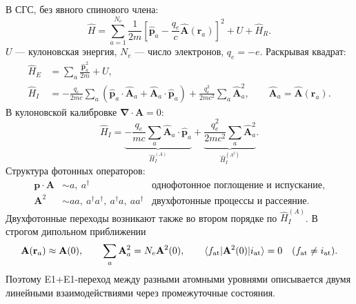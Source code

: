 \documentclass[../final.tex]{subfiles}
\begin{document}
В СГС, без явного спинового члена:
\begin{equation*}
    \hat H=\sum_{a=1}^{N_e}\frac1{2m}
      \left[\hat{\mathbf p}_a-\frac{q_e}{c}
      \hat{\mathbf A}(\mathbf r_a)\right]^2+U+\hat H_R.
\end{equation*}
\(U\) --- кулоновская энергия, \(N_e\) --- число электронов,
\(q_e=-e\). Раскрывая квадрат:
\begin{align*}
    \hat H_E&=\sum_a\frac{\hat{\mathbf p}_a^2}{2m}+U,\\
    \hat H_I&=-\frac{q_e}{2mc}\sum_a
      (\hat{\mathbf p}_a\cdot\hat{\mathbf A}_a+
       \hat{\mathbf A}_a\cdot\hat{\mathbf p}_a)
      +\frac{q_e^2}{2mc^2}\sum_a\hat{\mathbf A}_a^2,
      \qquad \hat{\mathbf A}_a=\hat{\mathbf A}(\mathbf r_a).
\end{align*}
В кулоновской калибровке \(\boldsymbol\nabla\cdot\mathbf A=0\):
\begin{equation*}
    \hat H_I=
      \underbrace{-\frac{q_e}{mc}\sum_a
        \hat{\mathbf A}_a\cdot\hat{\mathbf p}_a}_{\hat H_I^{(A)}}
      +\underbrace{\frac{q_e^2}{2mc^2}\sum_a
        \hat{\mathbf A}_a^2}_{\hat H_I^{(A^2)}}.
\end{equation*}
Структура фотонных операторов:
\begin{equation*}
    \begin{array}{ccl}
        \mathbf p\cdot\mathbf A&\sim a,\ a^\dagger&
            \text{однофотонное поглощение и испускание},\\
        \mathbf A^2&\sim aa,\ a^\dagger a^\dagger,\ a^\dagger a,\ aa^\dagger&
            \text{двухфотонные процессы и рассеяние}.
    \end{array}
\end{equation*}
Двухфотонные переходы возникают также во втором порядке по
\(\hat H_I^{(A)}\). В строгом дипольном приближении
\begin{equation*}
    \mathbf A(\mathbf r_a)\approx\mathbf A(0),\qquad
    \sum_a\mathbf A_a^2=N_e\mathbf A^2(0),\qquad
    \langle f_{\rm at}|\mathbf A^2(0)|i_{\rm at}\rangle=0
    \quad(f_{\rm at}\ne i_{\rm at}).
\end{equation*}
Поэтому E1+E1-переход между разными атомными уровнями описывается
двумя линейными взаимодействиями через промежуточные состояния.
\end{document}
